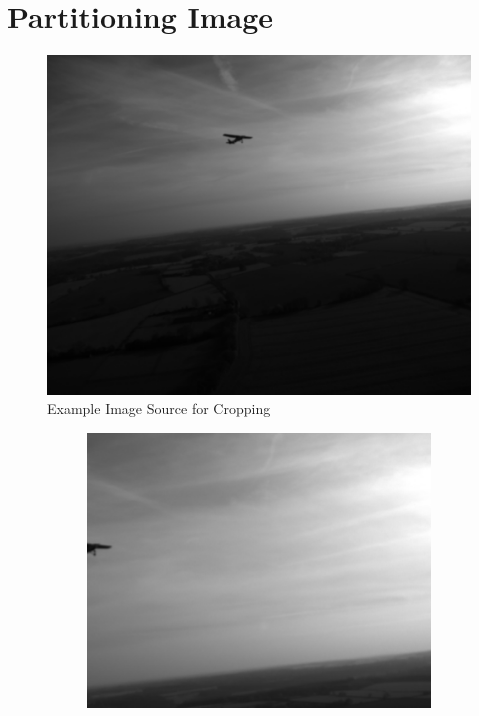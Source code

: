 \begin{table}
  \centering
  \label{tbl:anchorfree_perf}
  \vspace{-1ex}
  
\end{table}


\section{Partitioning Image}
{
\begin{figure}[p]
  \centering
  \includegraphics[height=0.33\textheight]{figures/crop_strat_source.png}
  \caption{Example Image Source for Cropping}
  \label{fig:crop-source}
\end{figure}
\begin{figure}[p]
  \centering
  \begin{subfigure}[][][t]{0.3\textwidth}
      \includegraphics[width=1\linewidth]{figures/crop_strat_illegal1.png}

\end{subfigure}
\end{figure}}
